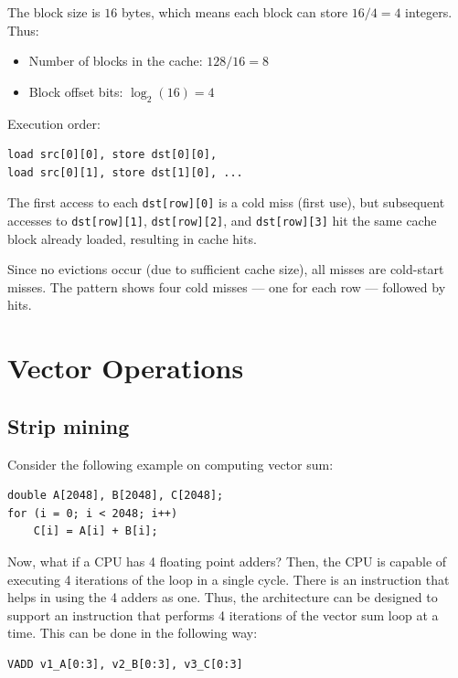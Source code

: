 \documentclass[12pt]{book}
\begin{document}
\begin{example}
    The block size is $16$ bytes, which means each block can store $16 / 4 = 4$ integers. Thus:
    \begin{itemize}
        \item Number of blocks in the cache: $128 / 16 = 8$
        \item Block offset bits: $\log_2(16) = 4$
    \end{itemize}

    Execution order:
    \begin{lstlisting}[style=cppstyle]
load src[0][0], store dst[0][0], 
load src[0][1], store dst[1][0], ...
    \end{lstlisting}

    The first access to each \texttt{dst[row][0]} is a cold miss (first use), but subsequent accesses to \texttt{dst[row][1]}, \texttt{dst[row][2]}, and \texttt{dst[row][3]} hit the same cache block already loaded, resulting in cache hits.

    Since no evictions occur (due to sufficient cache size), all misses are cold-start misses. The pattern shows four cold misses — one for each row — followed by hits.

\end{example}




\section{Vector Operations}
\subsection{Strip mining}
Consider the following example on computing vector sum:
\begin{lstlisting}[style=cppstyle]
double A[2048], B[2048], C[2048];
for (i = 0; i < 2048; i++) 
    C[i] = A[i] + B[i];
\end{lstlisting}

Now, what if a CPU has 4 floating point adders? Then, the CPU is capable of executing 4 iterations of the loop in a single cycle. There is an instruction that helps in using the 4 adders as one. Thus, the architecture can be designed to support an instruction that performs 4 iterations of the vector sum loop at a time. This can be done in the following way:

\begin{lstlisting}[style=cppstyle]
VADD v1_A[0:3], v2_B[0:3], v3_C[0:3]
\end{lstlisting}
\end{document}
